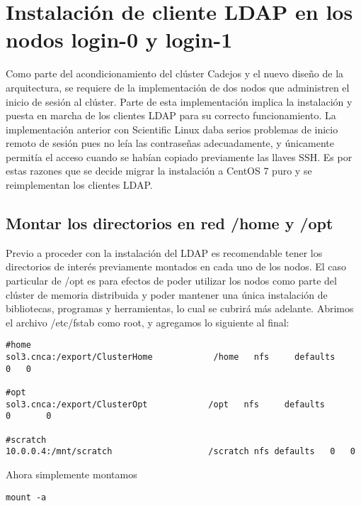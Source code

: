 \chapter{Instalación de cliente LDAP en los nodos login-0 y login-1}
Como parte del acondicionamiento del clúster Cadejos y el nuevo diseño de la arquitectura, se requiere de la implementación de dos nodos que administren el inicio de sesión al clúster. Parte de esta implementación implica la instalación y puesta en marcha de los clientes LDAP para su correcto funcionamiento. La implementación anterior con Scientific Linux daba serios problemas de inicio remoto de sesión pues no leía las contraseñas adecuadamente, y únicamente permitía el acceso cuando se habían copiado previamente las llaves SSH. Es por estas razones que se decide migrar la instalación a CentOS 7 puro y se reimplementan los clientes LDAP.  

\section{Montar los directorios en red /home y /opt}
Previo a proceder con la instalación del LDAP es recomendable tener los directorios de interés previamente montados en cada uno de los nodos. El caso particular de /opt es para efectos de poder utilizar los nodos como parte del clúster de memoria distribuida y poder mantener una única instalación de bibliotecas, programas y herramientas, lo cual se cubrirá más adelante. Abrimos el archivo /etc/fstab como root, y agregamos lo siguiente al final:
\begin{lstlisting} 
#home
sol3.cnca:/export/ClusterHome            /home   nfs     defaults        0	 0

#opt
sol3.cnca:/export/ClusterOpt            /opt   nfs     defaults        0       0

#scratch
10.0.0.4:/mnt/scratch					/scratch nfs defaults	0	0
\end{lstlisting}
Ahora simplemente montamos 
\begin{lstlisting} 
mount -a
\end{lstlisting}
